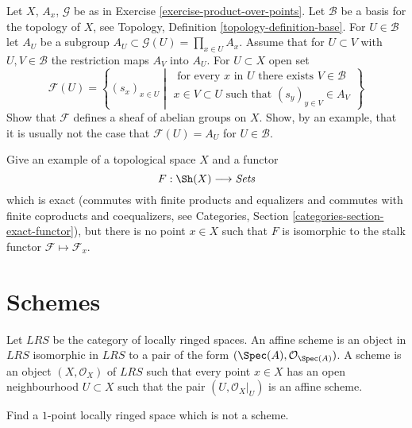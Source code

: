 \begin{exercise}
\label{exercise-modified-product-over-points}
Let $X$, $A_x$, $\mathcal{G}$ be as in
Exercise \ref{exercise-product-over-points}.
Let $\mathcal{B}$ be a basis for the topology of $X$, see
Topology, Definition \ref{topology-definition-base}.
For $U \in \mathcal{B}$ let $A_U$ be a subgroup
$A_U \subset \mathcal{G}(U) = \prod_{x \in U} A_x$. Assume that for
$U \subset V$ with $U, V \in \mathcal{B}$ the restriction
maps $A_V$ into $A_U$. For $U \subset X$ open set
$$
\mathcal{F}(U) =
\left\{
(s_x)_{x \in U}
\middle|
\begin{matrix}
\text{ for every }x\text{ in }U\text{ there exists } V \in \mathcal{B} \\
x \in V \subset U\text{ such that } (s_y)_{y \in V} \in A_V
\end{matrix}
\right\}
$$
Show that $\mathcal{F}$ defines a sheaf of abelian groups on $X$.
Show, by an example, that it is usually not the case that
$\mathcal{F}(U) = A_U$ for $U \in \mathcal{B}$.
\end{exercise}

\begin{exercise}
\label{exercise-exact-but-not-a-stalk-functor}
Give an example of a topological space $X$ and a functor
$$
F : \Sh(X) \longrightarrow \textit{Sets}
$$
which is exact (commutes with finite products and equalizers and commutes
with finite coproducts and coequalizers, see Categories, Section
\ref{categories-section-exact-functor}), but there is no point $x \in X$
such that $F$ is isomorphic to the stalk functor
$\mathcal{F} \mapsto \mathcal{F}_x$.
\end{exercise}




\section{Schemes}
\label{section-schemes}

\noindent
Let $LRS$ be the category of locally ringed spaces.
An affine scheme is an object in $LRS$ isomorphic in $LRS$ to
a pair of the form $(\Spec(A), {\mathcal O}_{\Spec(A)})$.
A scheme is an
object $(X, {\mathcal O}_X)$ of $LRS$ such that every point $x\in X$
has an open neighbourhood $U \subset X$ such that the pair
$(U, {\mathcal O}_X|_U)$ is an affine scheme.

\begin{exercise}
\label{exercise-one-point}
Find a $1$-point locally ringed space which is not a scheme.
\end{exercise}


